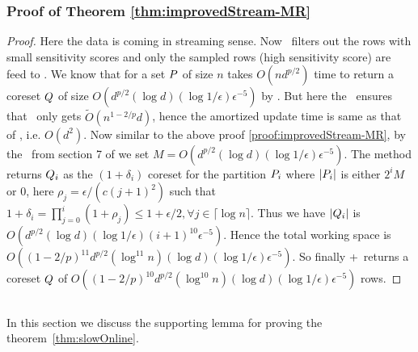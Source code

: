 \subsubsection{Proof of Theorem \ref{thm:improvedStream-MR}}
\begin{proof}\label{proof:improvedStream-MR}
 Here the data is coming in streaming sense. Now \online~filters out the rows with small sensitivity scores and only the sampled rows (high sensitivity score) are feed to \mrlw. We know that for a set $\*P$ of size $n$ takes $O(nd^{p/2})$ time to return a coreset $\*Q$ of size $O(d^{p/2}(\log d)(\log 1/\epsilon)\epsilon^{-5})$ by \cite{cohen2015p}. But here the \online~ensures that \mrlw~only gets $\tilde{O}(n^{1-2/p}d)$, hence the amortized update time is same as that of \online, i.e. $O(d^{2})$. Now similar to the above proof \ref{proof:improvedStream-MR}, by the \mrlw~from section 7 of \cite{har2004coresets} we set $M=O(d^{p/2}(\log d)(\log 1/\epsilon)\epsilon^{-5})$. The method returns $\*Q_{i}$ as the $(1 + \delta_{i})$ coreset for the partition $\*P_{i}$ where $|\*P_{i}|$ is either $2^{i}M$ or $0$, here $\rho_{j} = \epsilon/(c(j+1)^{2})$ such that $1+\delta_{i} = \prod_{j=0}^{i} (1 + \rho_{j}) \leq 1 + \epsilon/2, \forall j \in \lceil \log n \rceil$. Thus we have $|\*Q_{i}|$ is $O(d^{p/2}(\log d)(\log 1/\epsilon)(i+1)^{10}\epsilon^{-5})$. Hence the total working space is $O((1-2/p)^{11}d^{p/2}(\log^{11} n)(\log d)(\log 1/\epsilon)\epsilon^{-5})$. So finally \online+\mrlw~returns a coreset $\*Q$ of $O((1-2/p)^{10}d^{p/2}(\log^{10} n)(\log d)(\log 1/\epsilon)\epsilon^{-5})$ rows.
\end{proof}
% 
\subsection{}
In this section we discuss the supporting lemma for proving the theorem~\ref{thm:slowOnline}. 
